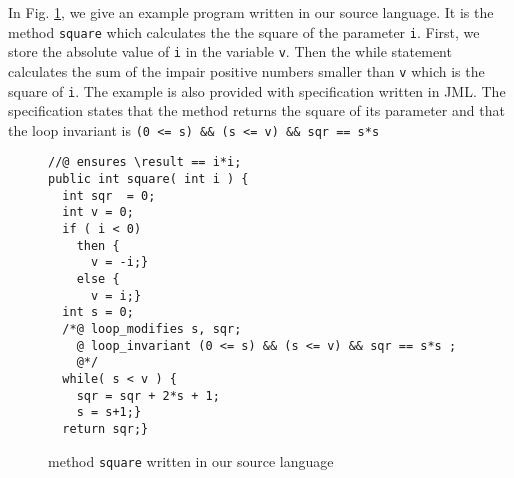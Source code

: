In Fig. \ref{pogComp:source:example}, we give an example program written in our source language. It is the method \lstinline!square! which calculates the 
the   square of the parameter \lstinline!i!. First, we store  the absolute value of \lstinline!i! in the variable \lstinline!v!.
Then  the while statement  calculates the sum of the impair positive numbers smaller than 
\lstinline!v! which is the square of \lstinline!i!.  The example is also
provided with specification written in JML. The specification states
that the method returns the square of its parameter and that the loop
invariant is \lstinline!(0 <= s) && (s <= v) && sqr == s*s!

\begin{figure}[ht!]
 \begin{lstlisting}[frame=trbl] 
//@ ensures \result == i*i; 
public int square( int i ) {
  int sqr  = 0;
  int v = 0;
  if ( i < 0)
    then {
      v = -i;} 
    else {
      v = i;}
  int s = 0;
  /*@ loop_modifies s, sqr;
    @ loop_invariant (0 <= s) && (s <= v) && sqr == s*s ;
    @*/
  while( s < v ) {
    sqr = sqr + 2*s + 1;
    s = s+1;}
  return sqr;}
\end{lstlisting}
\caption{\sc method  \lstinline!square! written in our source language}
\label{pogComp:source:example}

\end{figure}
